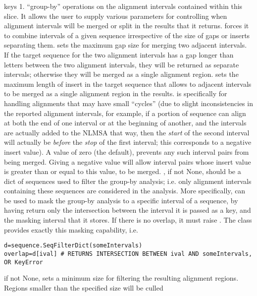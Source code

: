 \documentclass{howto}
\begin{document}
\begin{funcdesc}{keys}
  1. ``group-by'' operations on the alignment intervals
  contained within this slice.  It allows the user to supply
  various parameters for controlling when alignment intervals will be
  merged or split in the results that it returns.  
  forces it to combine intervals of a given sequence irrespective
  of the size of gaps or inserts separating them.   sets the
  maximum gap size for merging two adjacent intervals.  If the target sequence
  for the two alignment intervals has a gap longer than  
  letters between the two alignment intervals, they will be returned as
  separate intervals; otherwise they will be merged as a single alignment
  region.   sets the maximum length of insert in the target
  sequence that allows to adjacent intervals to be merged as a single alignment
  region in the results.   is specifically for handling
  alignments that may have small ``cycles'' (due to slight inconsistencies
  in the reported alignment intervals, for example, if a portion of sequence
  can align at both the end of one interval or at the beginning of another, and
  the intervals are actually added to the NLMSA that way, then the {\em start}
  of the second interval will actually be {\em before} the {\em stop} of 
  the first interval; this corresponds to a negative insert value).  A
   value of zero (the default), prevents any such interval
  pairs from being merged.  Giving a negative  value will allow
  interval pairs whose insert value is greater than or equal to this value, 
  to be merged.  , if not None, should be a dict of sequences
  used to filter the group-by analysis; i.e. only alignment intervals 
  containing these sequences are considered in the analysis.  More
  specifically,  can be used to mask the group-by analysis
  to a specific interval of a sequence, by having 
  return only the intersection between the interval it is passed as a key,
  and the masking interval that it stores.  If there is no overlap, it
  must raise .  The  class
  provides exactly this masking capability, i.e.
\begin{verbatim}
d=sequence.SeqFilterDict(someIntervals)
overlap=d[ival] # RETURNS INTERSECTION BETWEEN ival AND someIntervals, OR KeyError
\end{verbatim}
   if not None, sets a minimum size for filtering the resulting
  alignment regions.  Regions smaller than the specified size will be culled

\end{funcdesc}
\end{document}
